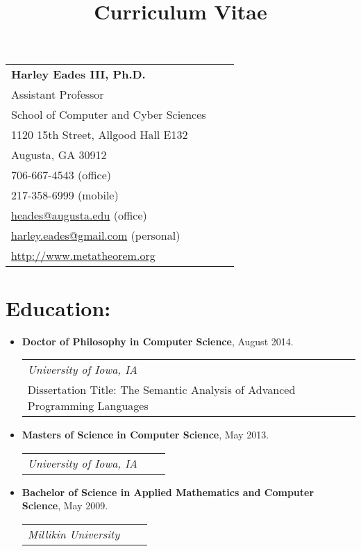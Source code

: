 \documentclass[11pt]{article}
\title{\vspace{-50px}Curriculum Vitae\vspace{-45px}}
\date{}
\begin{document}
\maketitle

\begin{tabular}{lll}
  \textbf{Harley Eades III, Ph.D.}\\
  Assistant Professor\\
  School of Computer and Cyber Sciences\\
  1120 15th Street, Allgood Hall E132\\
  Augusta, GA 30912\\
  706-667-4543 (office)\\
  217-358-6999 (mobile)\\
  \href{mailto:heades@augusta.edu}{heades@augusta.edu} (office)\\
  \href{mailto:harley.eades@gmail.com}{harley.eades@gmail.com} (personal)\\  
  \url{http://www.metatheorem.org}\\
\end{tabular}

\section{Education:}
\begin{itemize}
\item[] \textbf{Doctor of Philosophy in Computer Science}, August 2014.\\
  \begin{tabular}{lll}
    \emph{University of Iowa, IA}\\
    Dissertation Title: The Semantic Analysis of Advanced Programming Languages
  \end{tabular}

\item[] \textbf{Masters of Science in Computer Science}, May 2013.\\
  \begin{tabular}{lll}
    \emph{University of Iowa, IA}\\
  \end{tabular}

\item[] \textbf{Bachelor of Science in Applied Mathematics and Computer Science}, May 2009.\\
  \begin{tabular}{lll}
    \emph{Millikin University}\\
  \end{tabular}    
\end{itemize}
\end{document}
